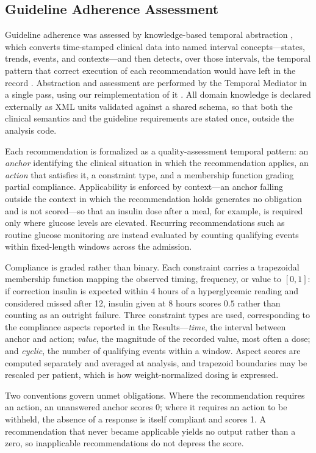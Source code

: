 \subsection{Guideline Adherence Assessment}

Guideline adherence was assessed by knowledge-based temporal abstraction
\citep{shahar1997framework}, which converts time-stamped clinical data into
named interval concepts---states, trends, events, and contexts---and then
detects, over those intervals, the temporal pattern that correct execution
of each recommendation would have left in the record
\citep{ben2024supporting}. Abstraction and
assessment are performed by the Temporal Mediator in a single pass, using
our reimplementation of it \citep{mediator-github}. All domain knowledge is
declared externally as XML units validated against a shared schema, so that
both the clinical semantics and the guideline requirements are stated once,
outside the analysis code.

Each recommendation is formalized as a quality-assessment temporal pattern:
an \emph{anchor} identifying the clinical situation in which the
recommendation applies, an \emph{action} that satisfies it, a constraint
type, and a membership function grading partial compliance. Applicability is
enforced by context---an anchor falling outside the context in which the
recommendation holds generates no obligation and is not scored---so that
an insulin dose after a meal, for example, is required only
where glucose levels are elevated. Recurring recommendations such as routine glucose
monitoring are instead evaluated by counting qualifying events within
fixed-length windows across the admission.

Compliance is graded rather than binary. Each constraint carries a
trapezoidal membership function mapping the observed timing, frequency, or
value to $[0,1]$: if correction insulin is expected within 4 hours of a
hyperglycemic reading and considered missed after 12, insulin given at 8
hours scores $0.5$ rather than counting as an outright failure. Three
constraint types are used, corresponding to the compliance aspects reported
in the Results---\emph{time}, the interval between anchor and action;
\emph{value}, the magnitude of the recorded value, most often a dose; and
\emph{cyclic}, the number of qualifying events within a window. Aspect
scores are computed separately and averaged at analysis, and trapezoid
boundaries may be rescaled per patient, which is how weight-normalized
dosing is expressed.

Two conventions govern unmet obligations. Where the recommendation requires
an action, an unanswered anchor scores 0; where it requires an action to be
withheld, the absence of a response is itself compliant and scores 1. A
recommendation that never became applicable yields no output rather than a
zero, so inapplicable recommendations do not depress the score.


